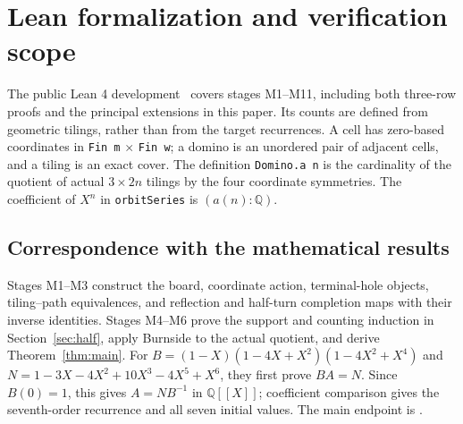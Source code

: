 \section{Lean formalization and verification scope}\label{sec:formalization}

The public Lean 4 development~\cite{repository} covers stages M1--M11,
including both three-row proofs and the principal extensions in this paper.
Its counts are defined from geometric tilings, rather than from the target
recurrences. A cell has zero-based coordinates in
\texttt{Fin m} $\times$ \texttt{Fin w}; a domino is an unordered pair of
adjacent cells, and a tiling is an exact cover. The definition
\texttt{Domino.a n} is the cardinality of the quotient of actual
$3\times2n$ tilings by the four coordinate symmetries.
The coefficient of $X^n$ in \texttt{orbitSeries} is $(a(n):\mathbb Q)$.

\subsection{Correspondence with the mathematical results}
Stages M1--M3 construct the board, coordinate action, terminal-hole
objects, tiling--path equivalences, and reflection and half-turn
completion maps with their inverse identities. Stages M4--M6 prove
the support and counting induction in Section~\ref{sec:half}, apply
Burnside to the actual quotient, and derive Theorem~\ref{thm:main}.
For $B=(1-X)(1-4X+X^2)(1-4X^2+X^4)$ and
$N=1-3X-4X^2+10X^3-4X^5+X^6$, they first prove $BA=N$.
Since $B(0)=1$, this gives $A=NB^{-1}$ in $\mathbb Q[[X]]$;
coefficient comparison gives the seventh-order recurrence and all seven
initial values. The main endpoint is
.

